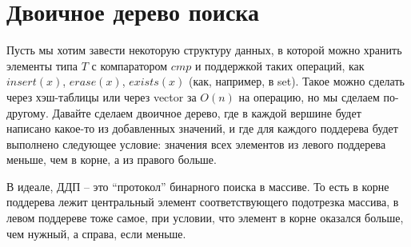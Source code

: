 \section{Двоичное дерево поиска}



Пусть мы хотим завести некоторую структуру данных, в которой можно хранить элементы типа $T$ с компаратором $cmp$ и поддержкой таких операций, как $insert(x)$, $erase(x)$, $exists(x)$ (как, например, в set). Такое можно сделать через хэш-таблицы или через vector за $O(n)$ на операцию, но мы сделаем по-другому. 
Давайте сделаем двоичное дерево, где в каждой вершине будет написано какое-то из добавленных значений, и где для каждого поддерева будет выполнено следующее условие: значения всех элементов из левого поддерева меньше, чем в корне, а из правого больше. \\ 

\begin{center} 
\end{center}

В идеале, ДДП -- это ``протокол'' бинарного поиска в массиве. То есть в корне поддерева лежит центральный элемент соответствующего подотрезка массива, в левом поддереве тоже самое, при условии, что элемент в корне оказался больше, чем нужный, а справа, если меньше. \\

